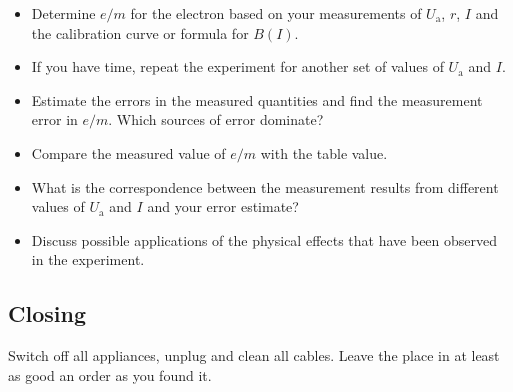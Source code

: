 \documentclass[../Elmag-labhefte-2020.tex]{subfiles}
\begin{document}
\begin{itemize}
    \item Determine $e/m$ for the electron based on your measurements of $U_\mathrm{a}$, $r$, $I$ and the calibration curve or formula for $B(I)$.
    \item If you have time, repeat the experiment for another set of values of $U_\mathrm{a}$ and $I$.
    \item Estimate the errors in the measured quantities and find the measurement error in $e/m$.
    Which sources of error dominate?
    \item Compare the measured value of $e/m$ with the table value.
    \item What is the correspondence between the measurement results from different values   of $U_\mathrm{a}$ and $I$ and your error estimate?
    \item Discuss possible applications of the physical effects that have been observed in the experiment.
\end{itemize}

\subsection{Closing}
Switch off all appliances, unplug and clean all cables. Leave the place in at least as good an order as you found it.
\end{document}
